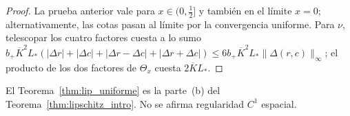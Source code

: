 \begin{proof}
La prueba anterior vale para $x\in(0,\frac12]$ y también en el límite $x=0$; alternativamente, las cotas
pasan al límite por la convergencia uniforme. Para $\nu$, telescopar los cuatro factores cuesta a lo sumo
$b_+\overline K^2L_*(|\Delta r|+|\Delta c|+|\Delta r-\Delta c|+|\Delta r+\Delta c|)\le6b_+\overline K^2L_*\|\Delta(r,c)\|_\infty$;
el producto de los dos factores de $\Theta_x$ cuesta $2\overline KL_*$.
\end{proof}

El Teorema~\ref{thm:lip_uniforme} es la parte~(b) del Teorema~\ref{thm:lipschitz_intro}. No se afirma
regularidad $C^1$ espacial.
